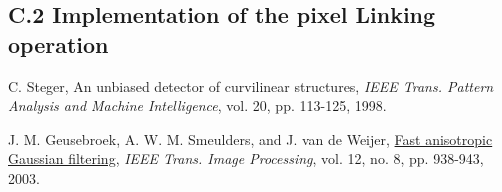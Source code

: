 \documentclass{article}
\begin{document}
\pagebreak
\subsection*{C.2 Implementation of the pixel Linking operation}



\pagebreak
\begin{thebibliography}{9}
\fontsize{10pt}{12pt}\selectfont
\raggedright

        C. Steger, An unbiased detector of curvilinear structures, 
        \emph{IEEE Trans. Pattern Analysis and Machine Intelligence},
        vol. 20, pp. 113-125, 1998.

        J. M. Geusebroek, A. W. M. Smeulders, and J. van de Weijer, 
        \ul{Fast anisotropic Gaussian filtering},
        \emph{IEEE Trans. Image Processing}, vol. 12, no. 8, pp. 938-943, 2003.


\end{thebibliography}


\end{document}
